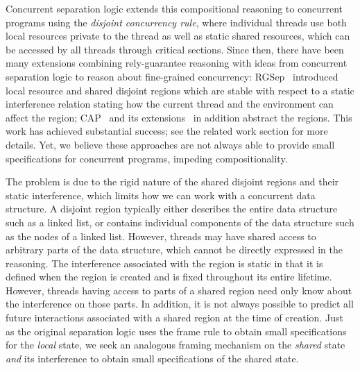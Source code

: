 Concurrent separation logic extends this compositional reasoning to
concurrent programs using the {\em disjoint concurrency rule}, where
individual threads use both local resources private to the
thread as well as static shared resources, which can be accessed by
all threads through critical sections. Since then, there have been many
extensions combining rely-guarantee reasoning with ideas from
concurrent separation logic to reason about fine-grained concurrency:
RGSep~\cite{viktor-marriage} 
introduced local resource and shared disjoint
regions which are stable with respect to a static interference
relation stating how the current thread and the environment can affect
the region; CAP~\cite{cap-ecoop10} and its
extensions~\cite{hocap,icap,tada} in addition abstract the
regions. This work has achieved substantial success; see the related
work section for more details. Yet, we believe these approaches
are not always able to provide small
specifications for concurrent programs, impeding 
compositionality.



The problem is due to the rigid nature of the shared disjoint regions and
their static interference, which   limits how we can  work
with a
concurrent data structure. A disjoint region typically either describes 
the entire data structure such as a linked list,  or contains
individual 
components of the data structure such as the nodes of a
linked list. However, threads may have shared access to arbitrary 
parts of the data structure, which cannot be directly expressed in the reasoning.
The interference associated with the region is static in that it is defined when
the region is created and is fixed throughout its entire lifetime. However, 
threads having access to parts of a shared region need only know about the interference on those parts. In addition, 
it is not always possible
to predict all future interactions  associated with  a shared
region at the time  of creation. Just as the original separation logic  uses the frame rule to
obtain small specifications for the \emph{local} state, we seek an analogous framing mechanism on the \emph{shared} state \emph{and} its
interference to obtain small
specifications of the shared state. 


